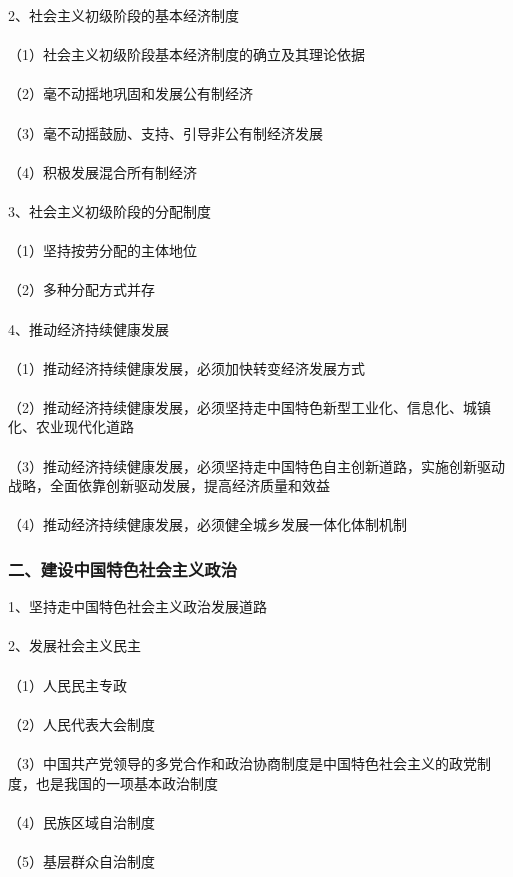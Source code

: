 \documentclass{ctexart}
\begin{document}
2、社会主义初级阶段的基本经济制度
\\\\
（1）社会主义初级阶段基本经济制度的确立及其理论依据
\\\\
（2）毫不动摇地巩固和发展公有制经济
\\\\
（3）毫不动摇鼓励、支持、引导非公有制经济发展
\\\\
（4）积极发展混合所有制经济
\\\\

3、社会主义初级阶段的分配制度
\\\\
（1）坚持按劳分配的主体地位
\\\\
（2）多种分配方式并存
\\\\

4、推动经济持续健康发展
\\\\
（1）推动经济持续健康发展，必须加快转变经济发展方式
\\\\
（2）推动经济持续健康发展，必须坚持走中国特色新型工业化、信息化、城镇化、农业现代化道路
\\\\
（3）推动经济持续健康发展，必须坚持走中国特色自主创新道路，实施创新驱动战略，全面依靠创新驱动发展，提高经济质量和效益
\\\\
（4）推动经济持续健康发展，必须健全城乡发展一体化体制机制

\subsubsection{二、建设中国特色社会主义政治}
1、坚持走中国特色社会主义政治发展道路
\\\\

2、发展社会主义民主
\\\\
（1）人民民主专政
\\\\
（2）人民代表大会制度
\\\\
（3）中国共产党领导的多党合作和政治协商制度是中国特色社会主义的政党制度，也是我国的一项基本政治制度
\\\\
（4）民族区域自治制度
\\\\
（5）基层群众自治制度
\\\\
\end{document}

